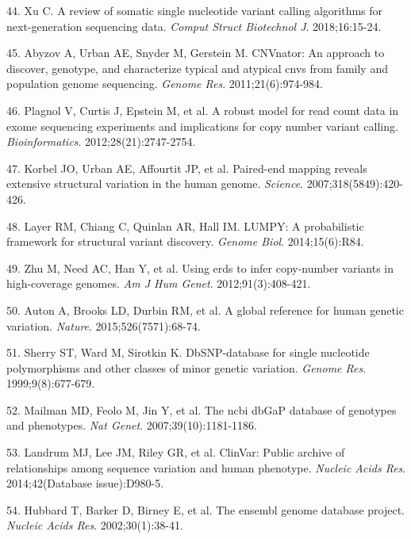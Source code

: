 \documentclass[11pt,letterpaper]{book}
\begin{document}
\leavevmode\hypertarget{ref-xu:2018aa}{}%
44. Xu C. A review of somatic single nucleotide variant calling algorithms for next-generation sequencing data. \emph{Comput Struct Biotechnol J}. 2018;16:15-24.

\leavevmode\hypertarget{ref-abyzov:2011aa}{}%
45. Abyzov A, Urban AE, Snyder M, Gerstein M. CNVnator: An approach to discover, genotype, and characterize typical and atypical cnvs from family and population genome sequencing. \emph{Genome Res}. 2011;21(6):974-984.

\leavevmode\hypertarget{ref-plagnol:2012aa}{}%
46. Plagnol V, Curtis J, Epstein M, et al. A robust model for read count data in exome sequencing experiments and implications for copy number variant calling. \emph{Bioinformatics}. 2012;28(21):2747-2754.

\leavevmode\hypertarget{ref-korbel:2007aa}{}%
47. Korbel JO, Urban AE, Affourtit JP, et al. Paired-end mapping reveals extensive structural variation in the human genome. \emph{Science}. 2007;318(5849):420-426.

\leavevmode\hypertarget{ref-layer:2014aa}{}%
48. Layer RM, Chiang C, Quinlan AR, Hall IM. LUMPY: A probabilistic framework for structural variant discovery. \emph{Genome Biol}. 2014;15(6):R84.

\leavevmode\hypertarget{ref-zhu:2012aa}{}%
49. Zhu M, Need AC, Han Y, et al. Using erds to infer copy-number variants in high-coverage genomes. \emph{Am J Hum Genet}. 2012;91(3):408-421.

\leavevmode\hypertarget{ref-auton:2015aa}{}%
50. Auton A, Brooks LD, Durbin RM, et al. A global reference for human genetic variation. \emph{Nature}. 2015;526(7571):68-74.

\leavevmode\hypertarget{ref-sherry:1999aa}{}%
51. Sherry ST, Ward M, Sirotkin K. DbSNP-database for single nucleotide polymorphisms and other classes of minor genetic variation. \emph{Genome Res}. 1999;9(8):677-679.

\leavevmode\hypertarget{ref-mailman:2007aa}{}%
52. Mailman MD, Feolo M, Jin Y, et al. The ncbi dbGaP database of genotypes and phenotypes. \emph{Nat Genet}. 2007;39(10):1181-1186.

\leavevmode\hypertarget{ref-landrum:2014aa}{}%
53. Landrum MJ, Lee JM, Riley GR, et al. ClinVar: Public archive of relationships among sequence variation and human phenotype. \emph{Nucleic Acids Res}. 2014;42(Database issue):D980-5.

\leavevmode\hypertarget{ref-hubbard:2002aa}{}%
54. Hubbard T, Barker D, Birney E, et al. The ensembl genome database project. \emph{Nucleic Acids Res}. 2002;30(1):38-41.
\end{document}
